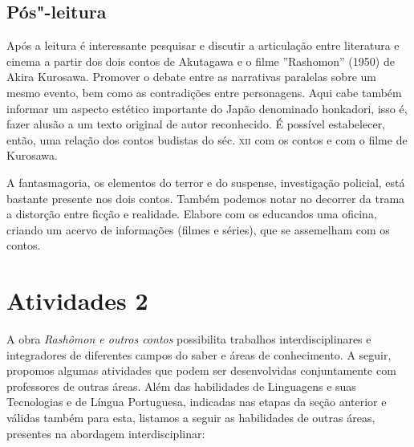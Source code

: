 \documentclass[12pt]{extarticle}
\begin{document}
\subsection{Pós"-leitura}




Após a leitura é interessante pesquisar e discutir a articulação entre
literatura e cinema a partir dos dois contos de Akutagawa e o filme
''Rashomon'' (1950) de Akira Kurosawa. Promover o debate entre as narrativas
paralelas sobre um mesmo evento, bem como as contradições entre personagens.
Aqui cabe também informar um aspecto estético importante do Japão denominado
honkadori, isso é, fazer alusão a um texto original de autor reconhecido. É
possível estabelecer, então, uma relação dos contos budistas do séc.
\textsc{xii} com os contos e com o filme de Kurosawa.


A fantasmagoria, os elementos do terror e do suspense, investigação policial,
está bastante presente nos dois contos. Também podemos notar no decorrer da
trama a distorção entre ficção e realidade. Elabore com os educandos uma
oficina, criando um acervo de informações (filmes e séries), que se assemelham
com os contos.




\section{Atividades 2}



A obra \emph{Rashômon e outros contos} possibilita trabalhos interdisciplinares
e integradores de diferentes campos do saber e áreas de conhecimento. A seguir,
propomos algumas atividades que podem ser desenvolvidas conjuntamente com
professores de outras áreas. Além das habilidades de Linguagens e suas
Tecnologias e de Língua Portuguesa, indicadas nas etapas da seção anterior e
válidas também para esta, listamos a seguir as habilidades de outras áreas,
presentes na abordagem interdisciplinar:
\end{document}
